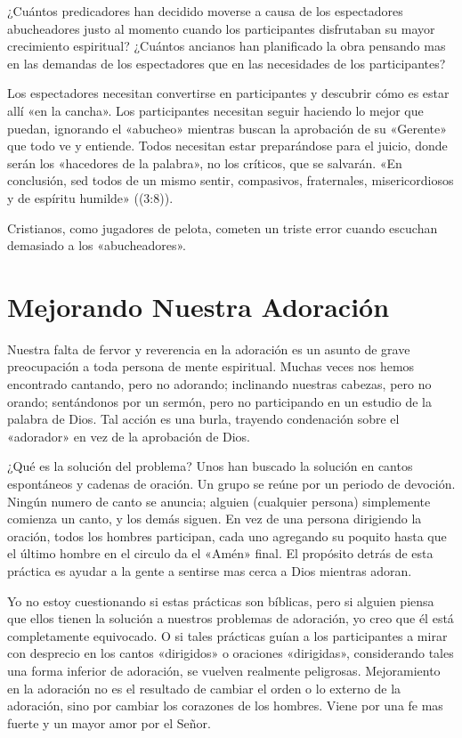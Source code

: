 \documentclass[12pt, twoside, openright]{book}
\begin{document}
¿Cuántos predicadores han decidido moverse a causa de los espectadores abucheadores justo al momento cuando los participantes disfrutaban su mayor crecimiento espiritual? ¿Cuántos ancianos han planificado la obra pensando mas en las demandas de los espectadores que en las necesidades de los participantes?

Los espectadores necesitan convertirse en participantes y descubrir cómo es estar allí «en la cancha». Los participantes necesitan seguir haciendo lo mejor que puedan, ignorando el «abucheo» mientras buscan la aprobación de su «Gerente» que todo ve y entiende. Todos necesitan estar preparándose para el juicio, donde serán los «hacedores de la palabra», no los críticos, que se salvarán. «En conclusión, sed todos de un mismo sentir, compasivos, fraternales, misericordiosos y de espíritu humilde» ((3:8)). 

Cristianos, como jugadores de pelota, cometen un triste error cuando escuchan demasiado a los «abucheadores».

\section{Mejorando Nuestra Adoración}
Nuestra falta de fervor y reverencia en la adoración es un asunto de grave preocupación a toda persona de mente espiritual. Muchas veces nos hemos encontrado cantando, pero no adorando; inclinando nuestras cabezas, pero no orando; sentándonos por un sermón, pero no participando en un estudio de la palabra de Dios. Tal acción es una burla, trayendo condenación sobre el «adorador» en vez de la aprobación de Dios.

¿Qué es la solución del problema? Unos han buscado la solución en cantos espontáneos y cadenas de oración. Un grupo se reúne por un periodo de devoción. Ningún numero de canto se anuncia; alguien (cualquier persona) simplemente comienza un canto, y los demás siguen. En vez de una persona dirigiendo la oración, todos los hombres participan, cada uno agregando su poquito hasta que el último hombre en el circulo da el «Amén» final. El propósito detrás de esta práctica es ayudar a la gente a sentirse mas cerca a Dios mientras adoran.

Yo no estoy cuestionando si estas prácticas son bíblicas, pero si alguien piensa que ellos tienen la solución a nuestros problemas de adoración, yo creo que él está completamente equivocado. O si tales prácticas guían a los participantes a mirar con desprecio en los cantos «dirigidos» o oraciones «dirigidas», considerando tales una forma inferior de adoración, se vuelven realmente peligrosas. Mejoramiento en la adoración no es el resultado de cambiar el orden o lo externo de la adoración, sino por cambiar los corazones de los hombres. Viene por una fe mas fuerte y un mayor amor por el Señor. 
\end{document}
